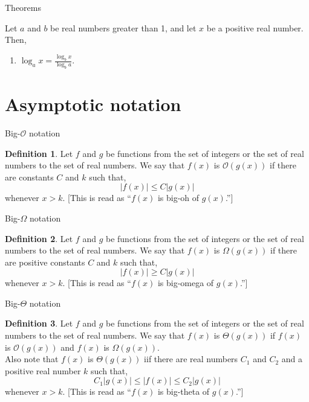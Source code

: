 \documentclass{beamer}
\theoremstyle{definition}
\newtheorem{defn}{Definition}[section]
\begin{document}
\begin{frame}{Theorems}
    \begin{theorem}\label{theo:three}
        Let $a$ and $b$ be real numbers greater than 1, and let $x$ be a positive real number. Then,
        \begin{enumerate}
         \item $\log_a x = \frac{\log_b x}{\log_b a}$.
        \end{enumerate}
    \end{theorem}
\end{frame}

\section{Asymptotic notation}

\begin{frame}{Big-$\mathcal{O}$ notation}
    \begin{defn}
        Let $f$ and $g$ be functions from the set of integers or the set of real numbers to the set of real numbers. We say that $f(x)$ is $\mathcal{O}(g(x))$ if there are constants $C$ and $k$ such that,
        $$ |f(x)| \leq C|g(x)| $$
        whenever $x > k$. [This is read as ``$f(x)$ is big-oh of $g(x)$.'']
    \end{defn}
\end{frame}

\begin{frame}{Big-$\Omega$ notation}
    \begin{defn}
        Let $f$ and $g$ be functions from the set of integers or the set of real numbers to the set of real numbers. We say that $f(x)$ is $\Omega(g(x))$ if there are positive constants $C$ and $k$ such that,
        $$ |f(x)| \geq C|g(x)| $$
        whenever $x > k$. [This is read as ``$f(x)$ is big-omega of $g(x)$.'']
    \end{defn}
\end{frame}

\begin{frame}{Big-$\Theta$ notation}
    \begin{defn}
        Let $f$ and $g$ be functions from the set of integers or the set of real numbers to the set of real numbers. We say that $f(x)$ is $\Theta(g(x))$ if $f(x)$ is $\mathcal{O}(g(x))$ and $f(x)$ is $\Omega(g(x))$. \\
        Also note that $f(x)$ is $\Theta(g(x))$ iif there are real numbers $C_1$ and $C_2$ and a positive real number $k$ such that,
        $$ C_1 |g(x)| \leq |f(x)| \leq C_2 |g(x)| $$
        whenever $x > k$. [This is read as ``$f(x)$ is big-theta of $g(x)$.'']
    \end{defn}
\end{frame}
\end{document}

